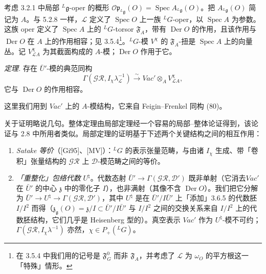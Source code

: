 考虑 3.2.1 中局部 ${}^{L}\mathfrak{g}$-oper 的概形 $\mathcal{O}\mathfrak{p}_{{}^{L}\mathfrak{g}}(O)=\operatorname{Spec}A_{{}^{L}\mathfrak{g}}(O)$。把 $A_{{}^{L}\mathfrak{g}}(O)$ 简记为 $A$。与 5.2.8 一样，$\mathcal{L}$ 定义了 $\operatorname{Spec}O$ 上一族 ${}^{L}G$-oper，以 $\operatorname{Spec}A$ 为参数。这族 oper 定义了 $\operatorname{Spec}A$ 上的 ${}^{L}G$-torsor $\mathfrak{F}_A$，带有 $\operatorname{Der}O$ 的作用，且该作用与 $\operatorname{Der}O$ 在 $A$ 上的作用相容；见 3.5.4\footnote{在 3.5.4 中我们用的记号是 $\mathfrak{F}_G^0$ 而非 $\mathfrak{F}_A$，并考虑了 $\mathcal{L}$ 为 $\omega_O$ 的平方根这一「特殊」情形。}。${}^{L}G$-模 $V^\chi$ 的 $\mathfrak{F}_A$-扭是 $\operatorname{Spec}A$ 上的向量丛。记 $V^\chi_{\mathcal{L}A}$ 为其截面构成的 $A$-模；$\operatorname{Der}O$ 作用于它。

 \emph{定理.} 存在 $\bar U'$-模的典范同构
\begin{equation}\tag{257}
\Gamma(\mathcal{GR},I_\chi\lambda_{\mathcal{L}}^{-1})\xrightarrow{\sim}Vac'\otimes_AV^\chi_{\mathcal{L}A},
\end{equation}
它与 $\operatorname{Der}O$ 的作用相容。

这里我们用到 $Vac'$ 上的 $A$-模结构，它来自 Feigin--Frenkel 同构 (80)。

 关于证明略说几句。整体定理由局部定理经一个容易的局部--整体论证得到，该论证与 2.8 中所用者类似。局部定理的证明基于下述两个关键结构之间的相互作用：
\begin{enumerate}[label=(\roman*),leftmargin=2.2em]
\item \emph{Satake 等价}（[Gi95]、[MV]）：${}^{L}G$ 的表示张量范畴，与由诸 $I_\chi$ 生成、带「卷积」张量结构的 $\mathcal{GR}$ 上 $\mathcal{D}$-模范畴之间的等价。
\item \emph{「重整化」包络代数} $U^\natural$。代数态射 $\bar U'\to\Gamma(\mathcal{GR},\mathcal{D}')$ 既非单射（它消去$Vac'$ 在 $\bar U'$ 的中心 $\mathfrak{z}$ 中的零化子 $I$），也非满射（其像不含 $\operatorname{Der}O$）。我们把它分解为 $\bar U'\to U^\natural\to\Gamma(\mathcal{GR},\mathcal{D}')$，其中 $U^\natural$ 是在 $\bar U'/I\bar U'$ 上「添加」3.6.5 的代数胚 $I/I^2$ 而得（$\mathfrak{z}_{\mathfrak{g}}(O)=\mathfrak{z}/I\subset\bar U'/I\bar U'$ 与 $I/I^2$ 之间的交换关系来自 $I/I^2$ 上的代数胚结构，它们几乎是 Heisenberg 型的）。真空表示 $Vac'$ 作为 $U^\natural$-模不可约；$\Gamma(\mathcal{GR},I_\chi\lambda^{-1})$ 亦然，$\chi\in P_+({}^{L}G)$。
\end{enumerate}

